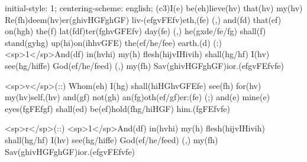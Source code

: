 initial-style: 1;
centering-scheme: english;
(c3)I(e) be(eh)lieve(hv) that(hv) my(hv) Re(fh)deem(hv)er(ghivHGFghGF) liv-(efgvFEfv)eth,(fe) (,) and(fd) that(ef) on(hgh) the(f) lat(fdf)ter(fghvGFEfv) day(fe) (,) he(gxde/fe/fg) shall(f) stand(gyhg) up(hi)on(ihhvGFE) the(ef/he/fee) earth.(d) (:) <sp>1</sp>And(df) in(hvhi) my(h) flesh(hijvIHivih) shall(hg/hf) I(hv) see(hg/hiffe) God(ef/he/feed) (,) my(fh) Sav(ghivHGFghGF)ior.(efgvFEfvfe)

<sp>v</sp>(::) Whom(eh) I(hg) shall(hiHGhvGFEfe) see(fh) for(hv) my(hv)self,(hv) and(gf) not(gh) an(fg)oth(ef/gf)er:(fe) (;) and(e) mine(e) eyes(fgFEfgf) shall(ed) be(ef)hold(fhg/hiHGF) him.(fgFEfvfe)

<sp>r</sp>(::) <sp>1</sp>And(df) in(hvhi) my(h) flesh(hijvIHivih) shall(hg/hf) I(hv) see(hg/hiffe) God(ef/he/feed) (,) my(fh) Sav(ghivHGFghGF)ior.(efgvFEfvfe)